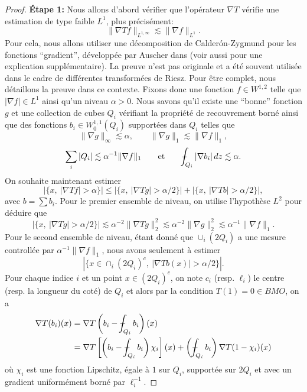 \documentclass[11pt]{amsart}
\def\Xint#1{\mathchoice
   {\XXint\displaystyle\textstyle{#1}}%
   {\XXint\textstyle\scriptstyle{#1}}%
   {\XXint\scriptstyle\scriptscriptstyle{#1}}%
   {\XXint\scriptscriptstyle\scriptscriptstyle{#1}}%
   \!\int}
\def\XXint#1#2#3{{\setbox0=\hbox{$#1{#2#3}{\int}$}
     \vcenter{\hbox{$#2#3$}}\kern-.5\wd0}}
\def\aver#1{\Xint-_{#1}}
\begin{document}
\begin{proof}
{\bf \'Etape 1:} Nous allons d'abord v\'erifier que l'op\'erateur $\nabla T$ v\'erifie une estimation de type faible $L^1$, plus pr\'ecis\'ement:
\begin{equation} \| \nabla T f \|_{L^{1,\infty}} \lesssim \|\nabla f\|_{L^1}. \label{eq:etape1}
 \end{equation}
Pour cela, nous allons utiliser une d\'ecomposition de Calder\'on-Zygmund pour les fonctions ``gradient'', d\'evelopp\'ee par Auscher dans \cite{Auscher-memoire} (voir aussi \cite{Auscherannexe} pour une explication suppl\'ementaire). La preuve n'est pas originale et a \'et\'e souvent utilis\'ee dans le cadre de diff\'erentes transform\'ees de Riesz. Pour \^etre complet, nous d\'etaillons la preuve dans ce contexte. Fixons donc une fonction $f\in W^{1,2}$ telle que $|\nabla f|\in L^1$ ainsi qu'un niveau $\alpha>0$. Nous savons qu'il existe une ``bonne'' fonction $g$ et une collection de cubes $Q_i$ v\'erifiant la propri\'et\'e de recouvrement born\'e ainsi que des fonctions $b_i\in W^{1,1}_0(Q_i)$ support\'ees dans $Q_i$ telles que
$$ \|\nabla g \|_{\infty} \lesssim \alpha, \qquad \|\nabla g\|_1 \lesssim \|\nabla f \|_1,$$
$$ \sum_i |Q_i| \lesssim \alpha^{-1} \|\nabla f\|_1   \qquad \textrm{et} \qquad \aver{Q_i} |\nabla b_i|\, dz \lesssim \alpha.$$
On souhaite maintenant estimer 
$$ \left| \{x,\ |\nabla Tf|>\alpha\} \right| \leq \left| \{x,\ |\nabla Tg|>\alpha/2\} \right| + \left| \{x,\ |\nabla Tb|>\alpha/2\} \right|,$$
avec $b=\sum b_i$. Pour le premier ensemble de niveau, on utilise l'hypoth\`ese $L^2$ pour d\'eduire que
$$ \left| \{x,\ |\nabla Tg|>\alpha/2\} \right| \lesssim \alpha^{-2} \|\nabla Tg\|_2^2 \lesssim \alpha^{-2} \|\nabla g\|_2^2 \lesssim \alpha^{-1} \|\nabla f\|_1.$$
Pour le second ensemble de niveau, \'etant donn\'e que $\cup_i (2Q_i)$ a une mesure controll\'ee par $\alpha^{-1} \|\nabla f\|_1 $, nous avons seulement \`a estimer
$$ \left| \{x \in \cap_i (2Q_i)^c,\  |\nabla Tb (x)|>\alpha/2\} \right|.$$
Pour chaque indice $i$ et un point $x\in (2Q_i)^c$, on note $c_i$ (resp. $\ell_i$) le centre (resp. la longueur du cot\'e) de $Q_i$ et alors par la condition $T(1)=0\in BMO$, on a
\begin{align*} 
\nabla T(b_i)(x) & = \nabla T \left(b_i - \aver{Q_i} b_i \right)(x) \\
 & = \nabla T \left[\left(b_i - \aver{Q_i} b_i \right)\chi_i \right](x) + \left(\aver{Q_i} b_i\right) \nabla T(1-\chi_i)(x) 
\end{align*}
o\`u $\chi_i$ est une fonction Lipschitz, \'egale \`a $1$ sur $Q_i$, support\'ee sur $2Q_i$ et avec un gradient uniform\'ement born\'e par $\ell_i^{-1}$.

\end{proof}
\end{document}
